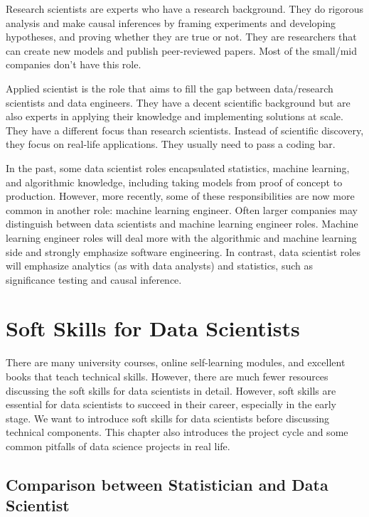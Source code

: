 \documentclass[
  12pt,
]{krantz}
\begin{document}
Research scientists are experts who have a research background. They do rigorous analysis and make causal inferences by framing experiments and developing hypotheses, and proving whether they are true or not. They are researchers that can create new models and publish peer-reviewed papers. Most of the small/mid companies don't have this role.

Applied scientist is the role that aims to fill the gap between data/research scientists and data engineers. They have a decent scientific background but are also experts in applying their knowledge and implementing solutions at scale. They have a different focus than research scientists. Instead of scientific discovery, they focus on real-life applications. They usually need to pass a coding bar.

In the past, some data scientist roles encapsulated statistics, machine learning, and algorithmic knowledge, including taking models from proof of concept to production. However, more recently, some of these responsibilities are now more common in another role: machine learning engineer. Often larger companies may distinguish between data scientists and machine learning engineer roles. Machine learning engineer roles will deal more with the algorithmic and machine learning side and strongly emphasize software engineering. In contrast, data scientist roles will emphasize analytics (as with data analysts) and statistics, such as significance testing and causal inference.

\hypertarget{SoftSkillsforDataScientists}{%
\chapter{Soft Skills for Data Scientists}\label{SoftSkillsforDataScientists}}

There are many university courses, online self-learning modules, and excellent books that teach technical skills. However, there are much fewer resources discussing the soft skills for data scientists in detail. However, soft skills are essential for data scientists to succeed in their career, especially in the early stage. We want to introduce soft skills for data scientists before discussing technical components. This chapter also introduces the project cycle and some common pitfalls of data science projects in real life.

\hypertarget{comparison-between-statistician-and-data-scientist}{%
\section{Comparison between Statistician and Data Scientist}\label{comparison-between-statistician-and-data-scientist}}
\end{document}
